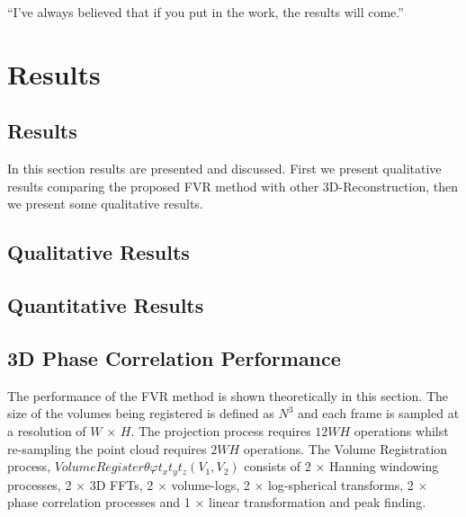 \begin{savequote}[8cm]
  ``I've always believed that if you put in the work, the results will come.''
\end{savequote}
\makeatletter
\chapter{Results}
\label{ResultsSection}

\section{Results}

In this section results are presented and discussed. First we present qualitative results comparing the proposed FVR method with other 3D-Reconstruction, then we present some qualitative results.  

		
		

\section{Qualitative Results}



\section{Quantitative Results}



\section{3D Phase Correlation Performance}

The performance of the FVR method is shown theoretically in this section. The size of the volumes being registered is defined as $N^3$ and each frame is sampled at a resolution of $W$ $\times$ $H$. The projection process requires $12WH$ operations whilst re-sampling the point cloud requires $2WH$ operations. The Volume Registration process, $VolumeRegister{\theta \varphi t_x t_y t_z}(V_1, V_2)$ consists of 2 $\times$ Hanning windowing processes, 2 $\times$ 3D FFTs, 2 $\times$ volume-logs, 2 $\times$ log-spherical transforms, 2 $\times$ phase correlation processes and 1 $\times$ linear transformation and peak finding. 

